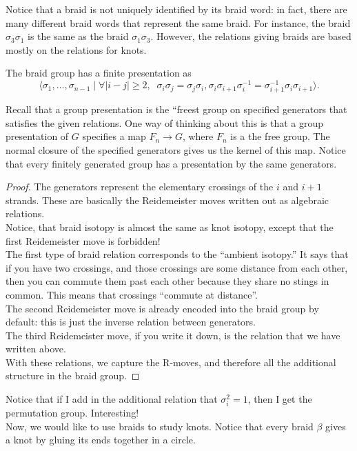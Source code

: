 Notice that a braid is not uniquely identified by its braid word: in fact, there are many different braid words that represent the same braid. For instance, the braid $\sigma_3\sigma_1$ is the same as the braid $\sigma_1\sigma_3$. However, the relations giving braids are based mostly on the relations for knots. 
\begin{theorem}
The braid group has a finite presentation as 
\[ \langle \sigma_1, \ldots, \sigma_{n-1} \;|\;\forall |i-j|\geq 2,\;\;  \sigma_{i}\sigma_j=\sigma_j\sigma_i  , \sigma_i \sigma_{i+1} \sigma_i^{-1}=\sigma_{i+1}^{-1}\sigma_i \sigma_{i+1} \rangle. \]
\end{theorem}
Recall that a group presentation is the ``freest group on specified generators that satisfies the given relations. One way of thinking about this is that a group presentation of $G$ specifies a map $F_n\to G$, where $F_n$ is a the free group. The normal closure of the specified generators gives us the kernel of this map. Notice that every finitely generated group has a presentation by the same generators. 
\begin{proof}
The generators represent the elementary crossings of the $i$ and $i+1$ strands. 
These are basically the Reidemeister moves written out as algebraic relations. \\
Notice, that braid isotopy is almost the same as knot isotopy, except that the first Reidemeister move is forbidden! \\
The first type of braid relation corresponds to the ``ambient isotopy.'' It says that if you have two crossings, and those crossings are some distance from each other, then you can commute them past each other because they share no stings in common. This means that crossings ``commute at distance''.\\
The second Reidemeister move is already encoded into the braid group by default: this is just the inverse relation between generators.  \\
The third Reidemeister move, if you write it down, is the relation that we have written above. \\
With these relations, we capture the R-moves, and therefore all the additional structure in the braid group. 
\end{proof}
Notice that if I add in the additional relation that $\sigma_i^2=1$, then I get the permutation group. Interesting!\\
Now, we would like to use braids to study knots. Notice that every braid $\beta$ gives a knot by gluing its ends together in a circle. 
